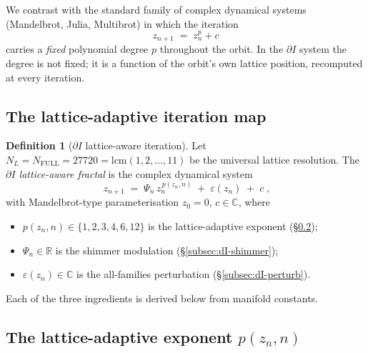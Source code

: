 \documentclass[11pt,a4paper]{article}
\theoremstyle{definition}
\newtheorem{definition}[theorem]{Definition}
\theoremstyle{remark}
\newcommand{\R}{\mathbb{R}}
\newcommand{\C}{\mathbb{C}}
\begin{document}
We contrast with the standard family of complex dynamical systems (Mandelbrot, Julia, Multibrot) in which the iteration
\[
z_{n+1} \;=\; z_{n}^{p} + c
\]
carries a \emph{fixed} polynomial degree $p$ throughout the orbit. In the $\partial I$ system the degree is not fixed; it is a function of the orbit's own lattice position, recomputed at every iteration.

\subsection{The lattice-adaptive iteration map}

\begin{definition}[$\partial I$ lattice-aware iteration]\label{def:dI-iteration}
Let $N_{L}=N_{\mathrm{FULL}}=27720=\mathrm{lcm}(1,2,\ldots,11)$ be the universal lattice resolution. The \emph{$\partial I$ lattice-aware fractal} is the complex dynamical system
\[
\boxed{\;z_{n+1} \;=\; \Psi_{n}\, z_{n}^{\,p(z_{n},n)} \;+\; \varepsilon(z_{n}) \;+\; c\;,}
\]
with Mandelbrot-type parameterisation $z_{0}=0$, $c\in\C$, where
\begin{itemize}[leftmargin=*]
\item $p(z_{n},n)\in\{1,2,3,4,6,12\}$ is the lattice-adaptive exponent (\S\ref{subsec:dI-exponent});
\item $\Psi_{n}\in\R$ is the shimmer modulation (\S\ref{subsec:dI-shimmer});
\item $\varepsilon(z_{n})\in\C$ is the all-families perturbation (\S\ref{subsec:dI-perturb}).
\end{itemize}
\end{definition}

Each of the three ingredients is derived below from manifold constants.

\subsection{The lattice-adaptive exponent $p(z_{n},n)$}\label{subsec:dI-exponent}
\end{document}
